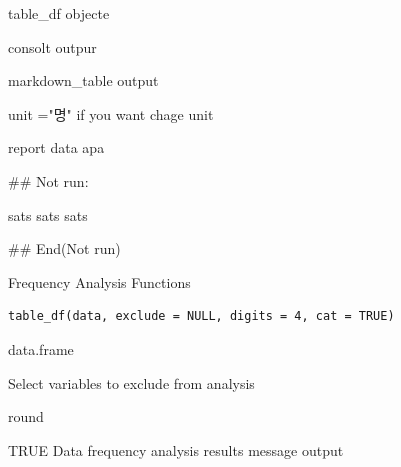 \documentclass[a4paper]{book}
\begin{document}
%
\begin{Arguments}
\begin{ldescription}
\item[\code{data}] table\_df objecte

\item[\code{print}] consolt outpur

\item[\code{md}] markdown\_table output

\item[\code{unit}] unit ="명" if you want chage unit
\end{ldescription}
\end{Arguments}
%
\begin{Value}
report data apa
\end{Value}
%
\begin{Examples}
\begin{ExampleCode}

\#\# Not run: 

sats %
sats %
sats %

## End(Not run)

\end{ExampleCode}
\end{Examples}
%
\begin{Description}
Frequency Analysis Functions
\end{Description}
%
\begin{Usage}
\begin{verbatim}
table_df(data, exclude = NULL, digits = 4, cat = TRUE)
\end{verbatim}
\end{Usage}
%
\begin{Arguments}
\begin{ldescription}
\item[\code{data}] data.frame

\item[\code{exclude}] Select variables to exclude from analysis

\item[\code{digits}] round

\item[\code{cat}] TRUE Data frequency analysis results message output
\end{ldescription}
\end{Arguments}
\end{document}

